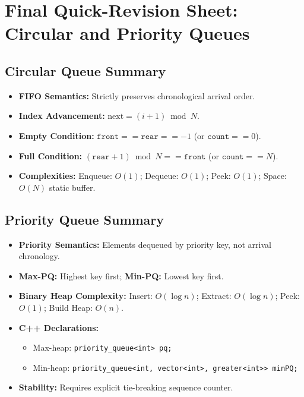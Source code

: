 \section{Final Quick-Revision Sheet: Circular and Priority Queues}

\subsection{Circular Queue Summary}
\begin{itemize}
    \item \textbf{FIFO Semantics:} Strictly preserves chronological arrival order.
    \item \textbf{Index Advancement:} $\text{next} = (i + 1) \bmod N$.
    \item \textbf{Empty Condition:} $\texttt{front} == \texttt{rear} == -1$ (or $\texttt{count} == 0$).
    \item \textbf{Full Condition:} $(\texttt{rear} + 1) \bmod N == \texttt{front}$ (or $\texttt{count} == N$).
    \item \textbf{Complexities:} Enqueue: $O(1)$; Dequeue: $O(1)$; Peek: $O(1)$; Space: $O(N)$ static buffer.
\end{itemize}

\subsection{Priority Queue Summary}
\begin{itemize}
    \item \textbf{Priority Semantics:} Elements dequeued by priority key, not arrival chronology.
    \item \textbf{Max-PQ:} Highest key first; \textbf{Min-PQ:} Lowest key first.
    \item \textbf{Binary Heap Complexity:} Insert: $O(\log n)$; Extract: $O(\log n)$; Peek: $O(1)$; Build Heap: $O(n)$.
    \item \textbf{C++ Declarations:}
    \begin{itemize}
        \item Max-heap: \texttt{priority\_queue<int> pq;}
        \item Min-heap: \texttt{priority\_queue<int, vector<int>, greater<int>> minPQ;}
    \end{itemize}
    \item \textbf{Stability:} Requires explicit tie-breaking sequence counter.
\end{itemize}

